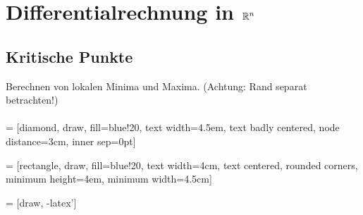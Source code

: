 \documentclass[a4paper,12pt]{article}
\begin{document}
\pagestyle{empty}

\section{Differentialrechnung in $\mathbb{R}^n$}

\subsection{Kritische Punkte}
Berechnen von lokalen Minima und Maxima. (Achtung: Rand separat betrachten!)\\
\\
 = [diamond, draw, fill=blue!20, 
text width=4.5em, text badly centered, node distance=3cm, inner sep=0pt]

 = [rectangle, draw, fill=blue!20, 
text width=4cm, text centered, rounded corners, minimum height=4em, minimum width=4.5cm]

 = [draw, -latex']

\newcommand\hlight[1]{\tikz[overlay, remember picture,baseline=-\the\dimexpr\fontdimen22\textfont2\relax]\node[rectangle,fill=yellow!50,rounded corners,fill opacity = 0.2,draw,thick,text opacity =1] {$#1$};} 
\end{document}
